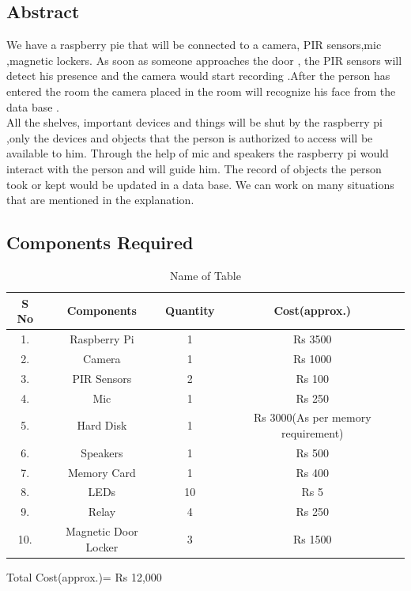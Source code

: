 \documentclass[12pt]{article}
\begin{document}
\subsection{Abstract} 

We have a raspberry pie that will be connected to a camera, PIR sensors,mic ,magnetic lockers. As soon as someone approaches the door , the PIR sensors will detect his presence and the camera would start recording .After the person has entered the room the camera placed in the room will recognize his face from the data base .\\[0.3cm]
All the shelves, important devices and things will be shut by the raspberry pi ,only the devices and objects that the person is authorized to access will be available to him. Through the help of mic and speakers the raspberry pi would interact with the person and will guide him. The record of objects the person took or kept would be updated in a data base. We can work on many situations that are mentioned in the explanation. 

\subsection{Components Required}
\begin{table}[!h]
	\renewcommand{\arraystretch}{1.3}
	\caption{Name of Table}
	\label{table1}
	\centering
	\begin{tabular}{|c|c|c|c|}
		\hline
		\bfseries S No & \bfseries Components & \bfseries Quantity & \bfseries Cost(approx.)\\
		\hline
		1. & Raspberry Pi & 1 & Rs 3500\\
		\hline
		2. & Camera & 1 & Rs 1000\\
		\hline
		3. & PIR Sensors & 2 & Rs 100\\
		\hline
		4. & Mic & 1 & Rs 250\\
		\hline
		5.  & Hard Disk & 1 & Rs 3000(As per memory requirement)\\
		\hline
		6. & Speakers & 1 & Rs 500\\
		\hline
		7. & Memory Card & 1 & Rs 400\\
		\hline
		8. & LEDs & 10 & Rs 5\\
		\hline
		9. & Relay & 4 & Rs 250\\
		\hline
		10. &  Magnetic Door Locker & 3 & Rs 1500\\
		\hline
				
	\end{tabular}
\end{table}
Total Cost(approx.)= Rs 12,000
\end{document}
